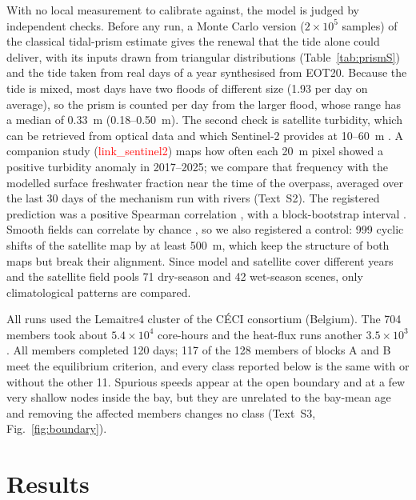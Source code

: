 \documentclass[a4paper,fleqn]{ems-dc}
\newcommand{\ph}[1]{\textcolor{red}{\textsf{#1}}}
\begin{document}
With no local measurement to calibrate against, the model is judged by independent checks.
Before any run, a Monte Carlo version ($2\times10^5$ samples) of the classical tidal-prism
estimate \citep{Fischer1979,Sanford1992} gives the renewal that the tide alone could
deliver, with its inputs drawn from triangular distributions (Table~\ref{tab:prismS}) and the
tide taken from real days of a year synthesised from EOT20. Because the tide is mixed, most
days have two floods of different size (1.93 per day on average), so the prism is counted
per day from the larger flood, whose range has a median of 0.33~m (0.18--0.50~m). The second
check is satellite turbidity, which can be retrieved from optical data \citep{Dogliotti2015}
and which Sentinel-2 provides at 10--60~m \citep{Drusch2012}. A companion study
(\ph{link\_sentinel2}) maps how often each 20~m pixel showed a positive turbidity anomaly in
2017--2025; we compare that frequency with the modelled surface freshwater fraction near the
time of the overpass, averaged over the last 30 days of the mechanism run with rivers
(Text~S2). The registered prediction was a positive Spearman correlation \citep{Spearman1904},
with a block-bootstrap interval \citep{Kunsch1989}. Smooth fields can correlate by chance
\citep{Clifford1989,Lennon2000}, so we also registered a control: 999 cyclic shifts of the
satellite map by at least 500~m, which keep the structure of both maps but break their
alignment. Since model and satellite cover different years and the satellite field pools 71
dry-season and 42 wet-season scenes, only climatological patterns are compared.

All runs used the Lemaitre4 cluster of the C\'ECI consortium (Belgium). The 704 members took
about $5.4\times10^4$ core-hours and the heat-flux runs another $3.5\times10^3$. All members
completed 120 days; 117 of the 128 members of blocks A and B meet the equilibrium criterion,
and every class reported below is the same with or without the other 11. Spurious speeds
appear at the open boundary and at a few very shallow nodes inside the bay, but they are
unrelated to the bay-mean age and removing the affected members changes no class (Text~S3,
Fig.~\ref{fig:boundary}).

\section{Results}\label{sec:results}
\end{document}
